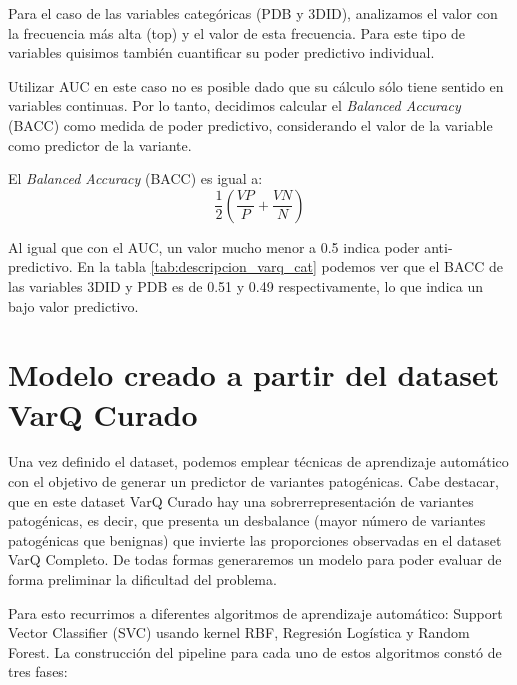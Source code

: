 Para el caso de las variables categóricas (PDB y 3DID), analizamos el valor con la frecuencia más alta (top) y el valor de esta frecuencia. Para este tipo de variables quisimos también cuantificar su poder predictivo individual. 


Utilizar AUC en este caso no es posible dado que su cálculo sólo tiene sentido en variables continuas. Por lo tanto, decidimos calcular el \textit{Balanced Accuracy} (BACC) \cite{Brodersen2010} como medida de poder predictivo, considerando el valor de la variable como predictor de la variante.

El \textit{Balanced Accuracy} (BACC) es igual a:
\begin{equation*}
    \frac{1}{2} (\frac{VP}{P} + \frac{VN}{N})
\end{equation*}

Al igual que con el AUC, un valor mucho menor a 0.5 indica poder anti-predictivo. En la tabla \ref{tab:descripcion_varq_cat} podemos ver que el BACC de las variables 3DID y PDB es de 0.51 y 0.49 respectivamente, lo que indica un bajo valor predictivo. 


\section{Modelo creado a partir del dataset VarQ Curado}

Una vez definido el dataset, podemos emplear técnicas de aprendizaje automático con el objetivo de generar un predictor de variantes patogénicas. Cabe destacar, que en este dataset VarQ Curado hay una sobrerrepresentación de variantes patogénicas, es decir, que presenta un desbalance (mayor número de variantes patogénicas que benignas) que invierte las proporciones observadas en el dataset VarQ Completo. De todas formas generaremos un modelo para poder evaluar de forma preliminar la dificultad del problema. 

Para esto recurrimos a diferentes algoritmos de aprendizaje automático: Support Vector Classifier (SVC) usando kernel RBF, Regresión Logística y Random Forest. La construcción del pipeline para cada uno de estos algoritmos constó de tres fases: 


